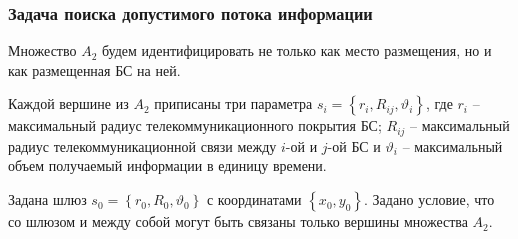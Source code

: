 \begin{frame}
    \frametitle{Задача поиска допустимого потока информации}
    \fontsize{10pt}{7.2}\selectfont
    \justifying

    \bigskip


    Множество $A_2$ будем идентифицировать не только как место размещения, но и как размещенная БС на ней.
    
    \bigskip
    
    Каждой вершине из $A_2$ приписаны три параметра $s_i = \left\{ r_i, R_{ij},\vartheta_i \right\}$, где $r_i$ -- максимальный радиус телекоммуникационного покрытия БС; $R_{ij}$ -- максимальный радиус телекоммуникационной связи между $i$-ой и $j$-ой БС и $\vartheta_i$ -- максимальный объем получаемый информации в единицу времени. 
    
    \bigskip
    
    Задана шлюз $s_0 = \left\{ r_0, R_0, \vartheta_0 \right\} $ с координатами $\left\{x_0, y_0 \right\}$. Задано условие, что со шлюзом и между собой могут быть связаны только вершины множества $A_2$.

\end{frame}


